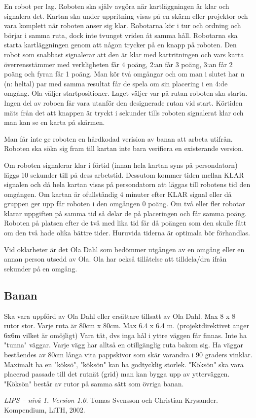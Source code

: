 \documentclass[a4paper,12pt]{article}
\begin{document}
En robot per lag.  Roboten ska själv avgöra när kartläggningen är klar och
signalera det.  Kartan ska under uppritning visas på en skärm eller projektor
och vara komplett när roboten anser sig klar.  Robotarna kör i tur och ordning
och börjar i samma ruta, dock inte tvunget vriden åt samma håll.  Robotarna ska
starta kartläggningen genom att någon trycker på en knapp på roboten.  Den
robot som snabbast signalerar att den är klar med kartritningen och vars karta
överrensstämmer med verkligheten får 4 poäng, 2:an får 3 poäng, 3:an får 2
poäng och fyran får 1 poäng.  Man kör två omgångar och om man i slutet har n
(n: heltal) par med samma resultat får de spela om sin placering i en 4:de
omgång.  Ola väljer startpositioner. Laget väljer var på rutan roboten ska
starta. Ingen del av roboen får vara utanför den designerade rutan vid start.
Körtiden mäts från det att knappen är tryckt i sekunder tills roboten
signalerat klar och man kan se en karta på skärmen.

Man får inte ge roboten en hårdkodad verision av banan att arbeta utifrån.
Roboten ska söka sig fram till kartan inte bara verifiera en existerande
version.

Om roboten signalerar klar i förtid (innan hela kartan syns på persondatorn)
läggs 10 sekunder till på dess arbetstid. Dessutom kommer tiden mellan KLAR
signalen och då hela kartan visas på persondatorn att läggas till robotens tid
den omgången.  Om kartan är ofullständig 4 minuter efter KLAR signal eller då
gruppen ger upp får roboten i den omgången 0 poäng.  Om två eller fler robotar
klarar uppgiften på samma tid så delar de på placeringen och får samma poäng.
Roboten på platsen efter de två med lika tid får då poängen som den skulle fått
om den två hade olika bättre tider.  Huruvida tiderna är optimala bör
förhandlas.

Vid oklarheter är det Ola Dahl som bedömmer utgången av en omgång eller en
annan person utsedd av Ola. Ola har också tillåtelse att tilldela/dra ifrån
sekunder på en omgång.

\subsection{Banan} 

Ska vara uppförd av Ola Dahl eller ersättare tillsatt av Ola Dahl.  Max 8 x 8 rutor
stor. Varje ruta är 80cm x 80cm. Max 6.4 x 6.4 m. (projektdirektivet anger 6x6m
vilket är omöjligt) Vara tät, dvs inga hål i yttre väggen får finnas.  Inte ha
"tunna" väggar. Varje vägg har alltså en otillgänglig ruta bakom sig.  Ha
väggar beståendes av 80cm långa vita pappskivor som skär varandra i 90 graders
vinklar.  Maximalt ha en "köksö", "köksön" kan ha godtycklig storlek. "Köksön"
ska vara placerad passade till det rutnät (grid) man kan bygga upp av
ytterväggen. "Köksön" består av rutor på samma sätt som övriga banan.

\begin{thebibliography}{99}
\textit{LIPS -- nivå 1. Version 1.0.} Tomas Svensson
och Christian Krysander. Kompendium, LiTH, 2002.
\end{thebibliography}
\end{document}
